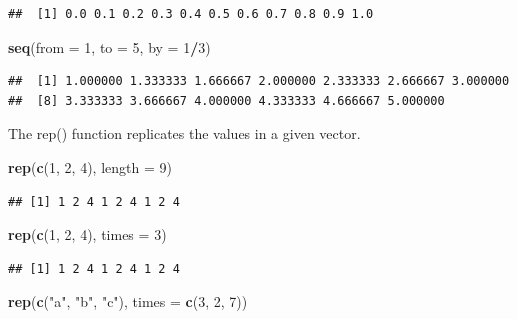 \documentclass[]{article}
\newenvironment{Shaded}{\begin{snugshade}}{\end{snugshade}}
\newcommand{\KeywordTok}[1]{\textcolor[rgb]{0.13,0.29,0.53}{\textbf{#1}}}
\newcommand{\DataTypeTok}[1]{\textcolor[rgb]{0.13,0.29,0.53}{#1}}
\newcommand{\DecValTok}[1]{\textcolor[rgb]{0.00,0.00,0.81}{#1}}
\newcommand{\StringTok}[1]{\textcolor[rgb]{0.31,0.60,0.02}{#1}}
\newcommand{\OperatorTok}[1]{\textcolor[rgb]{0.81,0.36,0.00}{\textbf{#1}}}
\newcommand{\NormalTok}[1]{#1}
\begin{document}
\begin{verbatim}
##  [1] 0.0 0.1 0.2 0.3 0.4 0.5 0.6 0.7 0.8 0.9 1.0
\end{verbatim}

\begin{Shaded}
\begin{Highlighting}[]
\KeywordTok{seq}\NormalTok{(}\DataTypeTok{from =} \DecValTok{1}\NormalTok{, }\DataTypeTok{to =} \DecValTok{5}\NormalTok{, }\DataTypeTok{by =} \DecValTok{1}\OperatorTok{/}\DecValTok{3}\NormalTok{)}
\end{Highlighting}
\end{Shaded}

\begin{verbatim}
##  [1] 1.000000 1.333333 1.666667 2.000000 2.333333 2.666667 3.000000
##  [8] 3.333333 3.666667 4.000000 4.333333 4.666667 5.000000
\end{verbatim}

The rep() function replicates the values in a given vector.

\begin{Shaded}
\begin{Highlighting}[]
\KeywordTok{rep}\NormalTok{(}\KeywordTok{c}\NormalTok{(}\DecValTok{1}\NormalTok{, }\DecValTok{2}\NormalTok{, }\DecValTok{4}\NormalTok{), }\DataTypeTok{length =} \DecValTok{9}\NormalTok{)}
\end{Highlighting}
\end{Shaded}

\begin{verbatim}
## [1] 1 2 4 1 2 4 1 2 4
\end{verbatim}

\begin{Shaded}
\begin{Highlighting}[]
\KeywordTok{rep}\NormalTok{(}\KeywordTok{c}\NormalTok{(}\DecValTok{1}\NormalTok{, }\DecValTok{2}\NormalTok{, }\DecValTok{4}\NormalTok{), }\DataTypeTok{times =} \DecValTok{3}\NormalTok{)}
\end{Highlighting}
\end{Shaded}

\begin{verbatim}
## [1] 1 2 4 1 2 4 1 2 4
\end{verbatim}

\begin{Shaded}
\begin{Highlighting}[]
\KeywordTok{rep}\NormalTok{(}\KeywordTok{c}\NormalTok{(}\StringTok{"a"}\NormalTok{, }\StringTok{"b"}\NormalTok{, }\StringTok{"c"}\NormalTok{), }\DataTypeTok{times =} \KeywordTok{c}\NormalTok{(}\DecValTok{3}\NormalTok{, }\DecValTok{2}\NormalTok{, }\DecValTok{7}\NormalTok{))}
\end{Highlighting}
\end{Shaded}
\end{document}
